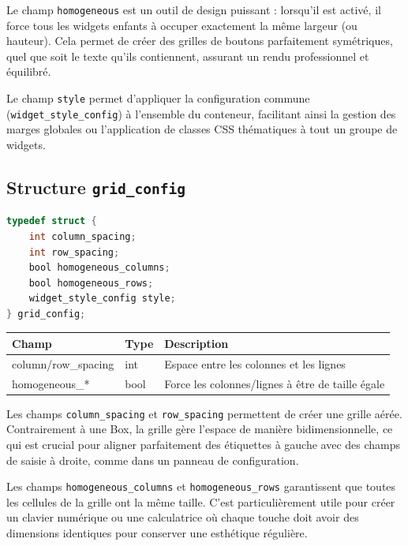 Le champ \texttt{homogeneous} est un outil de design puissant : lorsqu'il est activé, il force tous les widgets enfants à occuper exactement la même largeur (ou hauteur). Cela permet de créer des grilles de boutons parfaitement symétriques, quel que soit le texte qu'ils contiennent, assurant un rendu professionnel et équilibré.

Le champ \texttt{style} permet d'appliquer la configuration commune (\texttt{widget\_style\_config}) à l'ensemble du conteneur, facilitant ainsi la gestion des marges globales ou l'application de classes CSS thématiques à tout un groupe de widgets.

\subsection{Structure \texttt{grid\_config}}

\begin{lstlisting}[language=C]
typedef struct {
    int column_spacing;
    int row_spacing;
    bool homogeneous_columns;
    bool homogeneous_rows;
    widget_style_config style;
} grid_config;
\end{lstlisting}

\begin{center}
\begin{tabular}{|l|l|p{5cm}|}
\hline
\textbf{Champ} & \textbf{Type} & \textbf{Description} \\
\hline
column/row\_spacing & int & Espace entre les colonnes et les lignes \\
\hline
homogeneous\_* & bool & Force les colonnes/lignes à être de taille égale \\
\hline
\end{tabular}
\end{center}

\bigskip

Les champs \texttt{column\_spacing} et \texttt{row\_spacing} permettent de créer une grille aérée. Contrairement à une Box, la grille gère l'espace de manière bidimensionnelle, ce qui est crucial pour aligner parfaitement des étiquettes à gauche avec des champs de saisie à droite, comme dans un panneau de configuration.

Les champs \texttt{homogeneous\_columns} et \texttt{homogeneous\_rows} garantissent que toutes les cellules de la grille ont la même taille. C'est particulièrement utile pour créer un clavier numérique ou une calculatrice où chaque touche doit avoir des dimensions identiques pour conserver une esthétique régulière.


